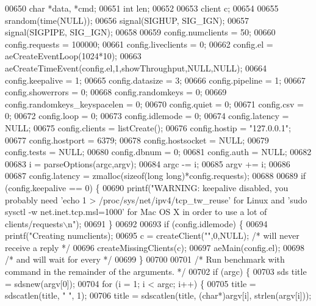 \begin{DoxyCode}
{{{{{{{{{{{{{{{{{{{{00650     \textcolor{keywordtype}{char} *data, *cmd;
00651     \textcolor{keywordtype}{int} len;
00652 
00653     client c;
00654 
00655     srandom(time(NULL));
00656     signal(SIGHUP, SIG\_IGN);
00657     signal(SIGPIPE, SIG\_IGN);
00658 
00659     config.numclients = 50;
00660     config.requests = 100000;
00661     config.liveclients = 0;
00662     config.el = aeCreateEventLoop(1024*10);
00663     aeCreateTimeEvent(config.el,1,showThroughput,NULL,NULL);
00664     config.keepalive = 1;
00665     config.datasize = 3;
00666     config.pipeline = 1;
00667     config.showerrors = 0;
00668     config.randomkeys = 0;
00669     config.randomkeys\_keyspacelen = 0;
00670     config.quiet = 0;
00671     config.csv = 0;
00672     config.loop = 0;
00673     config.idlemode = 0;
00674     config.latency = NULL;
00675     config.clients = listCreate();
00676     config.hostip = \textcolor{stringliteral}{"127.0.0.1"};
00677     config.hostport = 6379;
00678     config.hostsocket = NULL;
00679     config.tests = NULL;
00680     config.dbnum = 0;
00681     config.auth = NULL;
00682 
00683     i = parseOptions(argc,argv);
00684     argc -= i;
00685     argv += i;
00686 
00687     config.latency = zmalloc(\textcolor{keyword}{sizeof}(\textcolor{keywordtype}{long} \textcolor{keywordtype}{long})*config.requests);
00688 
00689     \textcolor{keywordflow}{if} (config.keepalive == 0) \{
00690         printf(\textcolor{stringliteral}{"WARNING: keepalive disabled, you probably need 'echo 1 >
       /proc/sys/net/ipv4/tcp\_tw\_reuse' for Linux and 'sudo sysctl -w net.inet.tcp.msl=1000' for Mac OS X in order to use a lot of
       clients/requests\(\backslash\)n"});
00691     \}
00692 
00693     \textcolor{keywordflow}{if} (config.idlemode) \{
00694         printf(\textcolor{stringliteral}{"Creating %
      numclients);
00695         c = createClient(\textcolor{stringliteral}{""},0,NULL); \textcolor{comment}{/* will never receive a reply */}
00696         createMissingClients(c);
00697         aeMain(config.el);
00698         \textcolor{comment}{/* and will wait for every */}
00699     \}
00700 
00701     \textcolor{comment}{/* Run benchmark with command in the remainder of the arguments. */}
00702     \textcolor{keywordflow}{if} (argc) \{
00703         sds title = sdsnew(argv[0]);
00704         \textcolor{keywordflow}{for} (i = 1; i < argc; i++) \{
00705             title = sdscatlen(title, \textcolor{stringliteral}{" "}, 1);
00706             title = sdscatlen(title, (\textcolor{keywordtype}{char}*)argv[i], strlen(argv[i]));
}}}}}}}}}}}}}}}}}}}}}
\end{DoxyCode}
